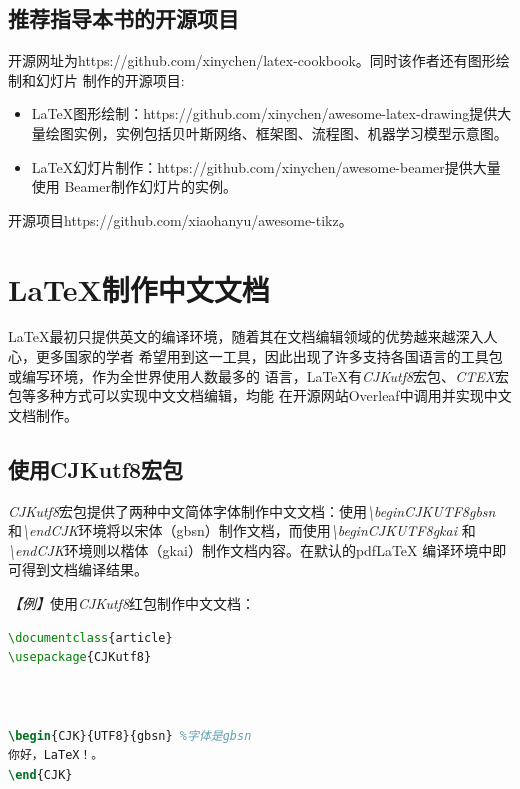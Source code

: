 \subsection{推荐指导本书的开源项目}
开源网址为https://github.com/xinychen/latex-cookbook。同时该作者还有图形绘制和幻灯片
制作的开源项目:
\begin{itemize}
      \item LaTeX图形绘制：https://github.com/xinychen/awesome-latex-drawing提供大
            量绘图实例，实例包括贝叶斯网络、框架图、流程图、机器学习模型示意图。
      \item LaTeX幻灯片制作：https://github.com/xinychen/awesome-beamer提供大量使用
            Beamer制作幻灯片的实例。
\end{itemize}

\begin{tcolorbox}[colback=red!5!white, colframe=red!50!black, title=参考资料]
      开源项目https://github.com/xiaohanyu/awesome-tikz。
\end{tcolorbox}

\section{\LaTeX 制作中文文档}
LaTeX最初只提供英文的编译环境，随着其在文档编辑领域的优势越来越深入人心，更多国家的学者
希望用到这一工具，因此出现了许多支持各国语言的工具包或编写环境，作为全世界使用人数最多的
语言，LaTeX有\emph{CJKutf8}宏包、\emph{CTEX}宏包等多种方式可以实现中文文档编辑，均能
在开源网站Overleaf中调用并实现中文文档制作。

\subsection{使用CJKutf8宏包}
\emph{CJKutf8}宏包提供了两种中文简体字体制作中文文档：使用\emph{\textbackslash begin{CJK}{UTF8}{gbsn}}
和\emph{\textbackslash end{CJK}}环境将以宋体（gbsn）制作文档，而使用\emph{\textbackslash begin{CJK}{UTF8}{gkai}}
和\emph{\textbackslash end{CJK}}环境则以楷体（gkai）制作文档内容。在默认的pdfLaTeX
编译环境中即可得到文档编译结果。

\emph{【例】}使用\emph{CJKutf8}红包制作中文文档：
\begin{lstlisting}[language=TeX, caption={CJKutf8示例}]
\documentclass{article}
\usepackage{CJKutf8}



\begin{CJK}{UTF8}{gbsn} %字体是gbsn
你好，LaTeX！。
\end{CJK}


\end{lstlisting}

